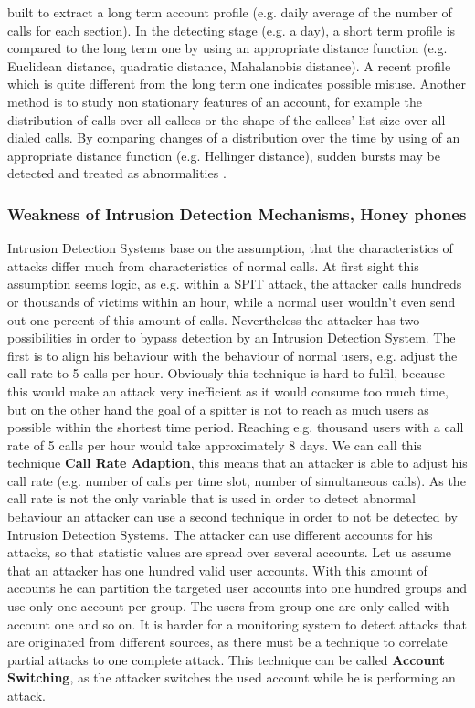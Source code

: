 \documentclass[final
	]{issa}
\begin{document}
built to extract a long term account profile (e.g. daily average of the number of calls for each section). In the detecting stage (e.g. a day), a short term profile is compared to the long term
one by using an appropriate distance function (e.g. Euclidean distance, quadratic distance, Mahalanobis distance). A recent profile which is quite different from the long term one indicates
possible misuse. Another method is to study non stationary features of an account, for example the distribution of calls over all callees or the shape of the callees' list size over all dialed calls. By comparing changes of a distribution over the time by using of an appropriate distance function (e.g. Hellinger distance), sudden bursts may be detected and treated as abnormalities \cite{paper:heoneyhol}.
\subsubsection{Weakness of Intrusion Detection Mechanisms, Honey phones}
Intrusion Detection Systems base on the assumption, that the characteristics of attacks differ much from characteristics of normal calls. At first sight this assumption seems logic, as e.g. within a SPIT attack, the attacker calls hundreds or thousands of victims within an hour, while a normal user wouldn't even send out one percent of this amount of calls. Nevertheless the attacker has two possibilities in order to bypass detection by an Intrusion Detection System. The first is to align his behaviour with the behaviour of normal users, e.g. adjust the call rate to 5 calls per hour. Obviously this technique is hard to fulfil, because this would make an attack very inefficient as it would consume too much time, but on the other hand the goal of a spitter is not to reach as much users as possible within the shortest time period. Reaching e.g. thousand users with a call rate of 5 calls per hour would take approximately 8 days. We can call this technique \textbf{Call Rate Adaption}, this means that an attacker is able to adjust his call rate (e.g. number of calls per time slot, number of simultaneous calls). As the call rate is not the only variable that is used in order to detect abnormal behaviour an attacker can use a second technique in order to not be detected by Intrusion Detection Systems. The attacker can use different accounts for his attacks, so that statistic values are spread over several accounts. Let us assume that an attacker has one hundred valid user accounts. With this amount of accounts he can partition the targeted user accounts into one hundred groups and use only one account per group. The users from group one are only called with account one and so on. It is harder for a monitoring system to detect attacks that are originated from different sources, as there must be a technique to correlate partial attacks to one complete attack. This technique can be called \textbf{Account Switching}, as the attacker switches the used account while he is performing an attack.\\
\end{document}
